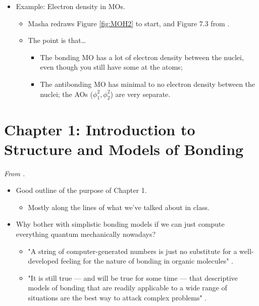 \documentclass[../notes.tex]{subfiles}
\begin{document}
\begin{itemize}
    \item Example: Electron density in  MOs.
    \begin{itemize}
        \item Masha redraws Figure \ref{fig:MOH2} to start, and Figure 7.3 from \textcite{bib:CHEM26100Notes}.
        \item The point is that\dots
        \begin{itemize}
            \item The bonding MO has a lot of electron density between the nuclei, even though you still have some at the atoms;
            \item The antibonding MO has minimal to no electron density between the nuclei; the AOs ($\phi_1^2,\phi_2^2$) are very separate.
        \end{itemize}
    \end{itemize}
\end{itemize}



\section{Chapter 1: Introduction to Structure and Models of Bonding}
\emph{From \textcite{bib:Anslyn}.}
\begin{itemize}
    \item {}Good outline of the purpose of Chapter 1.
    \begin{itemize}
        \item Mostly along the lines of what we've talked about in class.
    \end{itemize}
    \item Why bother with simplistic bonding models if we can just compute everything quantum mechanically nowadays?
    \begin{itemize}
        \item "A string of computer-generated numbers is just no substitute for a well-developed feeling for the nature of bonding in organic molecules" \parencite[3]{bib:Anslyn}.
        \item "It is still true --- and will be true for some time --- that descriptive models of bonding that are readily applicable to a wide range of situations are the best way to attack complex problems" \parencite[4]{bib:Anslyn}.
    \end{itemize}
\end{itemize}
\end{document}
